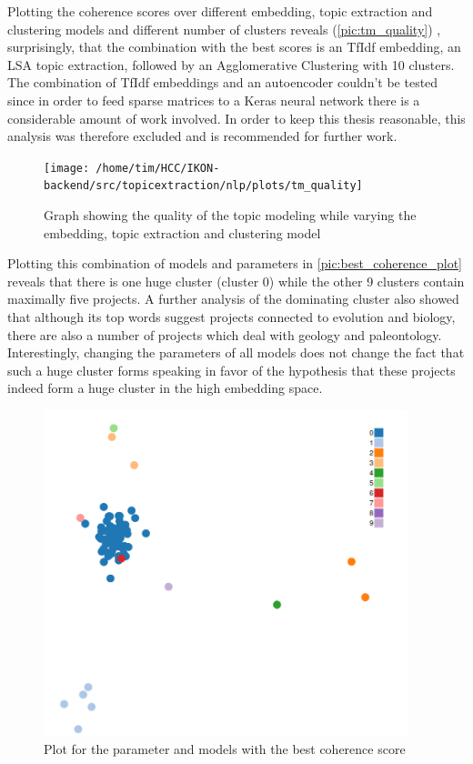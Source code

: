 Plotting the coherence scores over different embedding, topic extraction and clustering models and different number of clusters reveals (\autoref{pic:tm_quality}) , surprisingly, that the combination with the best scores is an TfIdf embedding, an LSA topic extraction, followed by an Agglomerative Clustering with 10 clusters. The combination of TfIdf embeddings and an autoencoder couldn't be tested since in order to feed sparse matrices to a Keras neural network there is a considerable amount of work involved. In order to keep this thesis reasonable, this analysis was therefore excluded and is recommended for further work.

\begin{figure}[t]
	\centering
	\texttt{[image: /home/tim/HCC/IKON-backend/src/topicextraction/nlp/plots/tm\_quality]}
	\caption{\label{pic:tm_quality} Graph showing the quality of the topic modeling while varying the embedding, topic extraction and clustering model}
\end{figure}

Plotting this combination of models and parameters in \autoref{pic:best_coherence_plot} reveals that there is one huge cluster (cluster 0) while the other 9 clusters contain maximally five projects. A further analysis of the dominating cluster also showed that although its top words suggest projects connected to evolution and biology, there are also a number of projects which deal with geology and paleontology. Interestingly, changing the parameters of all models does not change the fact that such a huge cluster forms speaking in favor of the hypothesis that these projects indeed form a huge cluster in the high embedding space.

\begin{figure}[t]
	\centering
	\includegraphics[width=400px]{../chapters/implementation/pics/best_coherence_plot}
	\caption{\label{pic:best_coherence_plot} Plot for the parameter and models with the best coherence score}
\end{figure}

